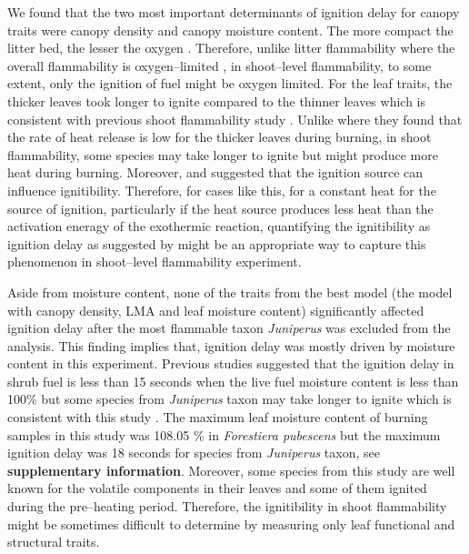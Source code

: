 \documentclass{bmcart}
\begin{document}
We found that the two most important determinants of ignition delay for canopy traits were canopy density and canopy moisture content. The more compact the litter bed, the lesser the oxygen  \citep{scarff2006leaf, van2012species, engber2012patterns, de2012leaf, cornwell2015flammability}.  
Therefore, unlike litter flammability where the overall flammability is oxygen--limited \citep{schwilk2015dimensions}, in shoot--level flammability, to some extent, only the ignition of fuel might be oxygen limited. For the leaf traits, the thicker leaves took longer to ignite compared to the thinner leaves which is consistent with previous shoot flammability study \citep{alam2020shoot}.   
Unlike \citet{ mason2016fire} where they found that the rate of heat release is low for the thicker leaves during burning, in shoot flammability, some species may take longer to ignite but might produce more heat during burning. Moreover, \citet{anderson1970forest} and  \citet{madrigal2012evaluation} suggested that the ignition source can influence ignitibility. Therefore, for cases like this, for a constant heat for the source of ignition, particularly if the heat source produces less heat than the activation eneragy of the exothermic reaction, quantifying the ignitibility as ignition delay as suggested by \citep{anderson1970forest} might be an appropriate way to capture this phenomenon in shoot--level flammability experiment.

Aside from moisture content, none of the traits from the best model (the model with canopy density, LMA and leaf moisture content) significantly affected ignition delay after the most flammable taxon \emph{Juniperus} was excluded from the analysis. This finding implies that, ignition delay was mostly driven by moisture content in this experiment. Previous studies suggested that the ignition delay in shrub fuel is less than 15 seconds when the live fuel moisture content is less than 100\% but some species from \emph{Juniperus} taxon may take longer to ignite which is consistent with this study \citep{pellizzaro2007seasonal}. The maximum leaf moisture content of burning samples in this study was 108.05 \% in \emph{Forestiera pubescens} but the maximum ignition delay was 18 seconds for species from \emph{Juniperus} taxon, see \textbf{supplementary information}.
Moreover, some species from this study are well known for the volatile components in their leaves and some of them  ignited during the pre--heating period. Therefore, the ignitibility in shoot flammability might be sometimes difficult to determine by measuring only leaf functional and structural traits. 
\end{document}
